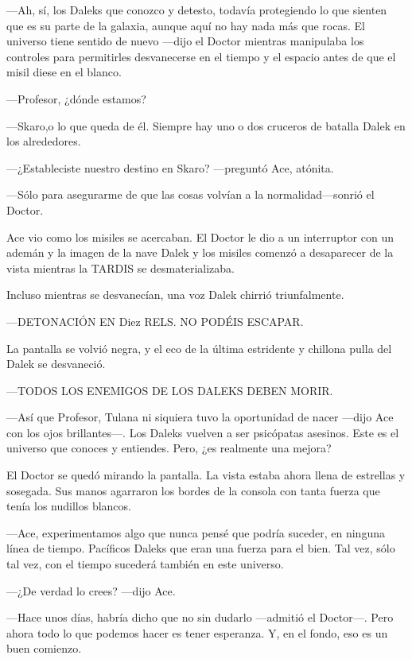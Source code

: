 ---Ah, sí, los Daleks que conozco y detesto, todavía protegiendo
lo que sienten que es su parte de la galaxia, aunque aquí no hay nada
más que rocas. El universo tiene sentido de nuevo ---dijo el Doctor
mientras manipulaba los controles para permitirles desvanecerse en el
tiempo y el espacio antes de que el misil diese en el blanco.

---Profesor, ¿dónde estamos?

---Skaro,o lo que queda de él. Siempre hay uno o dos cruceros
de batalla Dalek en los alrededores.

---¿Estableciste nuestro destino en Skaro? ---preguntó Ace,
atónita.

---Sólo para asegurarme de que las cosas volvían a la
normalidad---sonrió el Doctor.

Ace vio como los misiles se acercaban. El Doctor le dio a un
interruptor con un ademán y la imagen de la nave Dalek y los misiles
comenzó a desaparecer de la vista mientras la TARDIS se
desmaterializaba.

Incluso mientras se desvanecían, una voz Dalek chirrió
triunfalmente.

---DETONACIÓN EN Diez RELS. NO PODÉIS ESCAPAR.

La pantalla se volvió negra, y el eco de la última estridente y
chillona pulla del Dalek se desvaneció.

---TODOS LOS ENEMIGOS DE LOS DALEKS DEBEN MORIR.

---Así que Profesor, Tulana ni siquiera tuvo la oportunidad de
nacer ---dijo Ace con los ojos brillantes---. Los Daleks vuelven a ser
psicópatas asesinos. Este es el universo que conoces y entiendes. Pero,
¿es realmente una mejora?

El Doctor se quedó mirando la pantalla. La vista estaba ahora
llena de estrellas y sosegada. Sus manos agarraron los bordes de la
consola con tanta fuerza que tenía los nudillos blancos.

---Ace, experimentamos algo que nunca pensé que podría suceder,
en ninguna línea de tiempo. Pacíficos Daleks que eran una fuerza para el
bien. Tal vez, sólo tal vez, con el tiempo sucederá también en este
universo.

---¿De verdad lo crees? ---dijo Ace.

---Hace unos días, habría dicho que no sin dudarlo ---admitió el Doctor---.
 Pero ahora todo lo que podemos hacer es tener esperanza. Y,
en el fondo, eso es un buen comienzo.